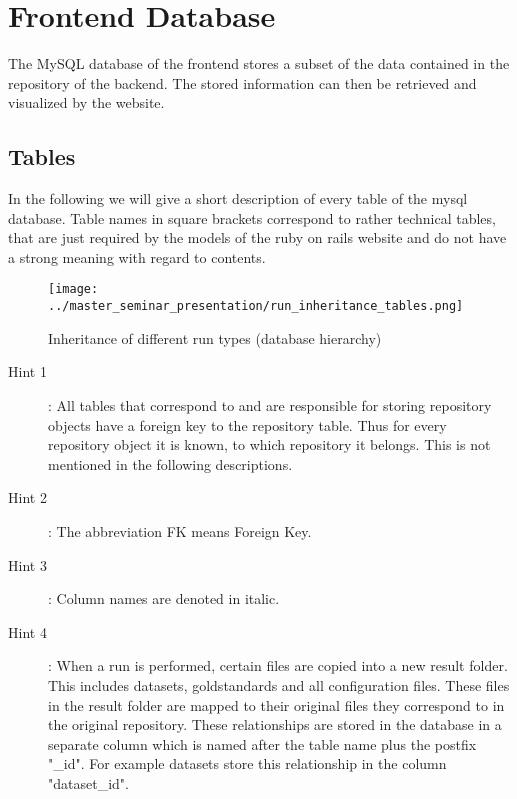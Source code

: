 
	\section{Frontend Database}\label{subsec_frontend_db}
	The MySQL database of the frontend stores a subset of the data contained in the repository of the backend. The stored information can then be retrieved and visualized by the website.
	 
	\subsection{Tables}
	In the following we will give a short description of every table of the mysql database. Table names in square brackets correspond to rather technical tables, that are just required by the models of the ruby on rails website and do not have a strong meaning with regard to contents.

\begin{figure}[hbtp]
\caption{Inheritance of different run types (database hierarchy)}
\label{fig_run_inheritance_tables}
\centering
\texttt{[image: ../master\_seminar\_presentation/run\_inheritance\_tables.png]}
\end{figure} 
	
	\begin{description}
	\item[Hint 1]: All tables that correspond to and are responsible for storing repository objects have a foreign key to the repository table. Thus for every repository object it is known, to which repository it belongs. This is not mentioned in the following descriptions.
	
	\item[Hint 2]: The abbreviation FK means Foreign Key.
	
	\item[Hint 3]: Column names are denoted in italic.
	
	\item[Hint 4]: When a run is performed, certain files are copied into a new result folder. This includes datasets, goldstandards and all configuration files. These files in the result folder are mapped to their original files they correspond to in the original repository. These relationships are stored in the database in a separate column which is named after the table name plus the postfix "\_id". For example datasets store this relationship in the column "dataset\_id".
	\end{description}

